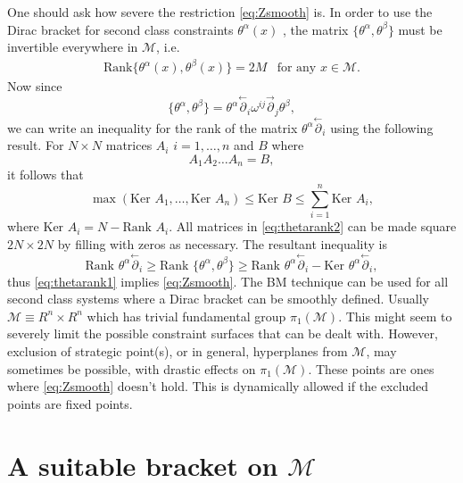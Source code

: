 \documentclass[a4paper,12pt]{article}
\theoremstyle{definition}
\theoremstyle{remark}
\numberwithin{equation}{section}
\newcommand{\al}{\alpha}
\newcommand{\be}{\beta}
\newcommand{\om}{\omega}
\newcommand{\M}{\mathcal{M}}
\newcommand{\pl}{\overset{\leftarrow}{\partial}}
\newcommand{\pr}{\overset{\rightarrow}{\partial}}
\begin{document}
One should ask how severe the restriction \eqref{eq:Zsmooth} is.
In order to use the Dirac bracket for second class constraints
$\theta^{\al}(x)$ , the matrix $\{\theta^{\al},\theta^{\be}\}$
must be invertible everywhere in $\M$, i.e.
\begin{eqnarray}\label{eq:thetarank1} \text{Rank
}{\{\theta^{\al}(x),\theta^{\be}(x)\}}= 2M & \text{for any } x \in
\M.
\end{eqnarray}
Now since
\begin{equation}\label{eq:thetarank2}
\{\theta^{\al},\theta^{\be}\}=\theta^{\al}\pl_i \om^{ij} \pr_j
\theta^{\be},
\end{equation}
we can write an inequality for the rank of the matrix
$\theta^{\al}\pl_i$ using the following result. For $N\times N$
matrices $A_i$ $i=1,\ldots, n$ and $B$ where
\begin{equation}
A_1 A_2 \ldots A_n =B,
\end{equation}
it follows that
\begin{equation}
\max{(\text{Ker } A_1, \ldots , \text{Ker } A_n)} \leq \text{Ker }
B \leq \sum_{i=1}^{n}{\text{Ker } A_i},
\end{equation}
where $\text{Ker } A_i=N- \text{Rank } A_i$. All matrices in
\eqref{eq:thetarank2} can be made square $2N\times 2N$ by filling
with zeros as necessary. The resultant inequality is
\begin{equation}
\text{Rank } \theta^{\al}\pl_i \geq \text{Rank }
\{\theta^{\al},\theta^{\be}\} \geq \text{Rank }
\theta^{\al}\pl_i-\text{Ker }\theta^{\al}\pl_i,
\end{equation}
thus \eqref{eq:thetarank1} implies \eqref{eq:Zsmooth}. The BM
technique can be used for all second class systems where a Dirac
bracket can be smoothly defined. Usually $\M \equiv R^n \times
R^n$ which has trivial fundamental group $\pi_1(\M)$. This might
seem to severely limit the possible constraint surfaces that can
be dealt with. However, exclusion of strategic point(s), or in
general, hyperplanes from $\M$, may sometimes be possible, with
drastic effects on $\pi_1(\M)$. These points are ones where
\eqref{eq:Zsmooth} doesn't hold. This is dynamically allowed if
the excluded points are fixed points.




\section{A suitable bracket on $\M$}\label{sec:Mybracket}
\end{document}
